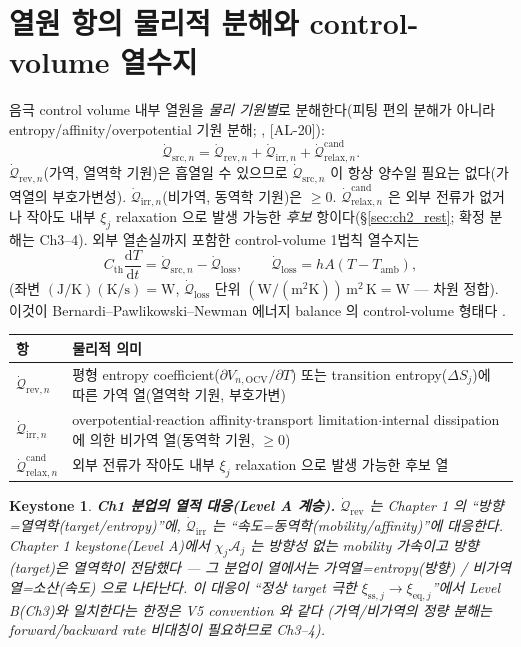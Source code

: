 \documentclass[11pt,a4paper]{article}
\newtheorem*{keybox}{Keystone}
\newcommand{\dd}{\mathrm{d}}
\newcommand{\eq}{\mathrm{eq}}
\newcommand{\OCV}{\mathrm{OCV}}
\newcommand{\irr}{\mathrm{irr}}
\newcommand{\rev}{\mathrm{rev}}
\newcommand{\src}{\mathrm{src}}
\newcommand{\loss}{\mathrm{loss}}
\newcommand{\amb}{\mathrm{amb}}
\newcommand{\rlx}{\mathrm{relax}}
\newcommand{\cand}{\mathrm{cand}}
\newcommand{\AL}[1]{\textsf{[AL-#1]}}
\begin{document}
\section{열원 항의 물리적 분해와 control-volume 열수지}\label{sec:ch2_decomp}
음극 control volume 내부 열원을 \emph{물리 기원별}로 분해한다(피팅 편의 분해가 아니라 entropy/affinity/overpotential
기원 분해; \cite{bernardi1985,rao1997}, \AL{20}):
\begin{equation}
\dot{\mathcal Q}_{\src,n}=\dot{\mathcal Q}_{\rev,n}+\dot{\mathcal Q}_{\irr,n}+\dot{\mathcal Q}_{\rlx,n}^{\cand}.
\label{eq:ch2_srcdecomp}
\end{equation}
$\dot{\mathcal Q}_{\rev,n}$(가역, 열역학 기원)은 흡열일 수 있으므로 $\dot{\mathcal Q}_{\src,n}$ 이 항상 양수일
필요는 없다(가역열의 부호가변성). $\dot{\mathcal Q}_{\irr,n}$(비가역, 동역학 기원)은 $\ge0$. $\dot{\mathcal Q}_{\rlx,n}^{\cand}$
은 외부 전류가 없거나 작아도 내부 $\xi_j$ relaxation 으로 발생 가능한 \emph{후보} 항이다(\S\ref{sec:ch2_rest};
확정 분해는 Ch3--4). 외부 열손실까지 포함한 control-volume 1법칙 열수지는
\begin{equation}
C_{\mathrm{th}}\frac{\dd T}{\dd t}=\dot{\mathcal Q}_{\src,n}-\dot{\mathcal Q}_{\loss},\qquad
\dot{\mathcal Q}_{\loss}=hA(T-T_\amb),
\label{eq:ch2_balance}
\end{equation}
(좌변 $\mathrm{(J/K)(K/s)=W}$, $\dot{\mathcal Q}_{\loss}$ 단위 $\mathrm{(W/(m^2K))\,m^2\,K=W}$ — 차원 정합).
이것이 Bernardi--Pawlikowski--Newman 에너지 balance 의 control-volume 형태다 \cite{bernardi1985,rao1997}.
\begin{longtable}{p{} p{}}
\toprule 항 & 물리적 의미 \\ \midrule \endhead
$\dot{\mathcal Q}_{\rev,n}$ & 평형 entropy coefficient($\partial V_{n,\OCV}/\partial T$) 또는 transition entropy($\Delta S_j$)에 따른 가역 열(열역학 기원, 부호가변) \\
$\dot{\mathcal Q}_{\irr,n}$ & overpotential$\cdot$reaction affinity$\cdot$transport limitation$\cdot$internal dissipation 에 의한 비가역 열(동역학 기원, $\ge0$) \\
$\dot{\mathcal Q}_{\rlx,n}^{\cand}$ & 외부 전류가 작아도 내부 $\xi_j$ relaxation 으로 발생 가능한 후보 열 \\
\bottomrule
\end{longtable}
\begin{keybox}
\textbf{Ch1 분업의 열적 대응(Level A 계승).} $\dot{\mathcal Q}_{\rev}$ 는 Chapter 1 의 ``방향=열역학(target/entropy)''에,
$\dot{\mathcal Q}_{\irr}$ 는 ``속도=동역학(mobility/affinity)''에 대응한다. Chapter 1 keystone(Level A)에서
$\chi_j\mathcal A_j$ 는 방향성 없는 mobility 가속이고 방향(target)은 열역학이 전담했다 — 그 분업이 열에서는
\emph{가역열=entropy(방향) / 비가역열=소산(속도)} 으로 나타난다. 이 대응이 ``정상 target 극한
$\xi_{\mathrm{ss},j}\to\xi_{\eq,j}$''에서 Level B(Ch3)와 일치한다는 한정은 V5 convention 와 같다
(가역/비가역의 \emph{정량} 분해는 forward/backward rate 비대칭이 필요하므로 Ch3--4).
\end{keybox}
\end{document}
